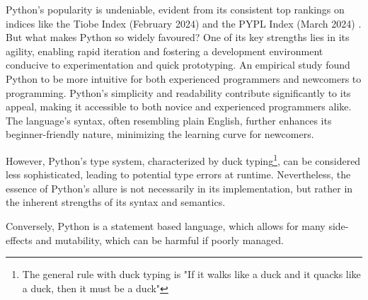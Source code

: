 \documentclass{l4proj}
\begin{document}
Python's popularity is undeniable, evident from its consistent top rankings on indices like the Tiobe Index (February 2024)\citep{TIOBE} and the PYPL Index (March 2024)\citep{Pypl} .
But what makes Python so widely favoured? 
One of its key strengths lies in its agility, enabling rapid iteration and fostering a development environment conducive to experimentation and quick prototyping.
An empirical study found Python to be more intuitive for both experienced programmers and newcomers to programming.\citep{10.1145/2534973}
Python's simplicity and readability contribute significantly to its appeal, making it accessible to both novice and experienced programmers alike.
The language's syntax, often resembling plain English, further enhances its beginner-friendly nature, minimizing the learning curve for newcomers.

However, Python's type system, characterized by duck typing\footnote{The general rule with duck typing is "If it walks like a duck and it quacks like a duck, then it must be a duck"}, can be considered less sophisticated, leading to potential type errors at runtime.\citep{Rossum_2017}
Nevertheless, the essence of Python's allure is not necessarily in its implementation, but rather in the inherent strengths of its syntax and semantics.

Conversely, Python is a statement based language, which allows for many side-effects and mutability, which can be harmful if poorly managed.





\end{document}
